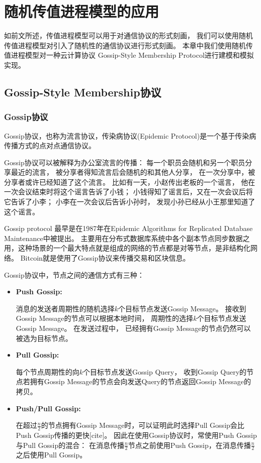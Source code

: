 
\chapter{随机传值进程模型的应用}\label{ch:gossip}

如前文所述，传值进程模型可以用于对通信协议的形式刻画，
我们可以使用随机传值进程模型对引入了随机性的通信协议进行形式刻画。
本章中我们使用随机传值进程模型对一种云计算协议
Gossip-Style Membership Protocol进行建模和模拟实现。

\section{Gossip-Style Membership协议}
\subsection{Gossip协议}
Gossip协议，也称为流言协议，传染病协议(Epidemic Protocol)是一个基于传染病传播方式的点对点通信协议。

Gossip协议可以被解释为办公室流言的传播：
每一个职员会随机和另一个职员分享最近的流言，
被分享者得知流言后会随机的和其他人分享，
在一次分享中，被分享者或许已经知道了这个流言。
比如有一天，小赵传出老板的一个谣言，
他在一次会议结束时将这个谣言告诉了小钱；
小钱得知了谣言后，又在一次会议后将它告诉了小李；
小李在一次会议后告诉小孙时，
发现小孙已经从小王那里知道了这个谣言。

Gossip protocol 最早是在1987年在Epidemic Algorithms for Replicated Database Maintenance中被提出。
主要用在分布式数据库系统中各个副本节点同步数据之用，这种场景的一个最大特点就是组成的网络的节点都是对等节点，是非结构化网络。
Bitcoin就是使用了Gossip协议来传播交易和区块信息。

Gossip协议中，节点之间的通信方式有三种：
\begin{itemize}
   \item {
      \textbf{Push Gossip:} 
      
      消息的发送者周期性的随机选择$k$个目标节点发送Gossip Message。
      接收到Gossip Message的节点可以根据本地时间，
      周期性的选择$k$个目标节点发送Gossip Message。
      在发送过程中，
      已经拥有Gossip Message的节点仍然可以被选为目标节点。
   }
   \item {
      \textbf{Pull Gossip:}

      每个节点周期性的向$k$个目标节点发送Gossip Query，
      收到Gossip Query的节点若拥有Gossip Message的节点会向发送Query的节点返回Gossip Message的拷贝。
   }
   \item {
      \textbf{Push/Pull Gossip:}

      在超过$\frac{n}{2}$的节点拥有Gossip Message时，可以证明此时选择Pull Gossip会比Push Gossip传播的更快[cite]。
      因此在使用Gossip协议时，常使用Push Gossip与Pull Gossip的混合：
      在消息传播$\frac{n}{2}$节点之前使用Push Gossip，在消息传播$\frac{n}{2}$之后使用Pull Gossip。
   }
\end{itemize}


